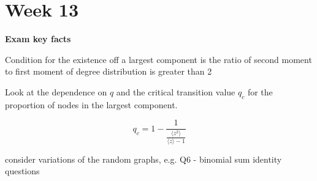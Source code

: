 \documentclass[12pt]{article}
\theoremstyle{definition}
\begin{document}
\section*{Week 13}

\textbf{Exam key facts}

Condition for the existence off a largest component is the ratio of second moment to first moment of degree distribution is greater than 2

Look at the dependence on $q$ and the critical transition value $q_c$ for the proportion of nodes in the largest component.

\[q_c = 1- \frac{1}{\frac{\langle z^2\rangle}{\langle z\rangle -1 }}\]

consider variations of the random graphs, e.g. Q6 - binomial sum identity questions 
\end{document}
